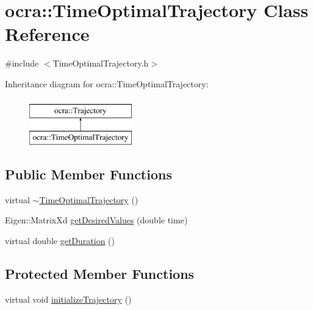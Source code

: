 \hypertarget{classocra_1_1TimeOptimalTrajectory}{}\section{ocra\+:\+:Time\+Optimal\+Trajectory Class Reference}
\label{classocra_1_1TimeOptimalTrajectory}


{\ttfamily \#include $<$Time\+Optimal\+Trajectory.\+h$>$}

Inheritance diagram for ocra\+:\+:Time\+Optimal\+Trajectory\+:\begin{figure}[H]
\begin{center}
\leavevmode
\includegraphics[height=2.000000cm]{dc/d2e/classocra_1_1TimeOptimalTrajectory}
\end{center}
\end{figure}
\subsection*{Public Member Functions}
\begin{DoxyCompactItemize}
\item 
virtual \hyperlink{classocra_1_1TimeOptimalTrajectory_a4f4e9ce2cd5b313d8418893d89b5cc8f}{$\sim$\+Time\+Optimal\+Trajectory} ()
\item 
Eigen\+::\+Matrix\+Xd \hyperlink{classocra_1_1TimeOptimalTrajectory_a42ca0b579494ac0c3c4c842896e592f9}{get\+Desired\+Values} (double time)
\item 
virtual double \hyperlink{classocra_1_1TimeOptimalTrajectory_a561d2d6ad9c40c88783265a91193a0ab}{get\+Duration} ()
\end{DoxyCompactItemize}
\subsection*{Protected Member Functions}
\begin{DoxyCompactItemize}
\item 
virtual void \hyperlink{classocra_1_1TimeOptimalTrajectory_a1ddd759810abea6db2462dca3aae585c}{initialize\+Trajectory} ()
\end{DoxyCompactItemize}
